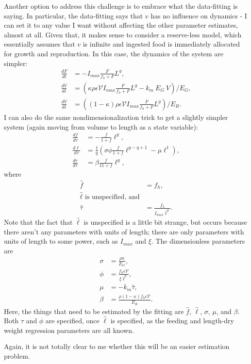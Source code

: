 \documentclass[12pt,reqno,final,pdftex]{amsart}\usepackage[]{graphicx}\usepackage[]{color}
\theoremstyle{plain}
\numberwithin{equation}{part}
\begin{document}
Another option to address this challenge is to embrace what the data-fitting is saying.
In particular, the data-fitting says that $v$ has no influence on dynamics - I can set it to any value I want without affecting the other parameter estimates, almost at all.
Given that, it makes sense to consider a reserve-less model, which essentially assumes that $v$ is infinite and ingested food is immediately allocated for growth and reproduction.
In this case, the dynamics of the system are simpler:
\begin{align}
\frac{dF}{dt} &= -I_{max} \frac{F}{f_h+F} L^g, \\
\frac{dV}{dt} &= \left(\kappa \rho \epsilon \mathcal{V} I_{max} \frac{F}{f_h+F} L^g - k_m~E_G~V\right)/E_G, \\
\frac{dV}{dt} &= \left((1-\kappa) \rho \epsilon \mathcal{V} I_{max} \frac{F}{f_h+F} L^g\right)/E_R.
\end{align}
I can also do the same nondimensionalization trick to get a slightly simpler system (again moving from volume to length as a state variable):
\begin{align}
\frac{df}{d\tau}&=-\frac{f}{1+f} \ell^g, \\
\frac{d\ell}{d\tau}&=\frac{1}{q}\left(\sigma \phi \frac{f}{1+f}\ell^{g-q+1}-\mu \ell^1\right), \\
\frac{dr}{d\tau}&=\beta\frac{f}{11+f}\ell^g,
\end{align}
where
\begin{align}
\hat{f} &= f_h, \\
\hat{\ell} \text{ is unspecified, and} \\
\hat{\tau} &= \frac{f_h}{I_{max}\hat{\ell}^g}.
\end{align}
Note that the fact that $\hat{\ell}$ is unspecified is a little bit strange, but occurs because there aren't any parameters with units of length; there are only parameters with units of length to some power, such as $I_{max}$ and $\xi$.
The dimensionless parameters are
\begin{align}
\sigma &= \frac{\rho \kappa}{E_G}, \\
\phi &= \frac{f_h \epsilon \mathcal{V}}{\xi \hat{\ell}^q}, \\
\mu &= -k_m \hat{\tau}, \\
\beta &= \frac{\rho (1-\kappa) f_h \epsilon \mathcal{V}}{E_R}.
\end{align}
Here, the things that need to be estimated by the fitting are $\hat{f}$, $\hat{\ell}$, $\sigma$, $\mu$, and $\beta$.
Both $\tau$ and $\phi$ are specified, once $\hat{\ell}$ is specified, as the feeding and length-dry weight regression parameters are all known.

Again, it is not totally clear to me whether this will be an easier estimation problem.
\end{document}
